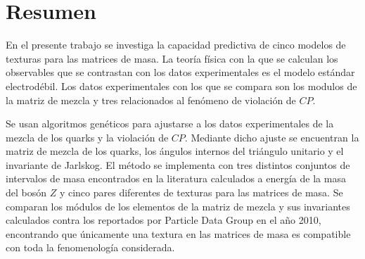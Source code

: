 \chapter*{Resumen}

En el presente trabajo se investiga la capacidad predictiva de cinco modelos de
texturas para las matrices de masa. La teor\'ia f\'isica con la que se calculan
los observables que se contrastan con los datos experimentales es el modelo
est\'andar electrod\'ebil. Los datos experimentales con los que se compara son
los modulos de la matriz de mezcla y  tres relacionados al fen\'omeno de
violaci\'on de $CP$.

Se usan algoritmos gen\'eticos para ajustarse a los datos experimentales de la 
mezcla de los quarks y la violaci\'on de $CP$. Mediante dicho ajuste se 
encuentran la matriz de mezcla de los quarks, los \'angulos internos del 
tri\'angulo unitario y el invariante de Jarlskog. El m\'etodo se implementa con
tres distintos conjuntos de intervalos de masa encontrados en la literatura 
calculados a energ\'ia de la masa del bos\'on $Z$ y cinco pares diferentes de
texturas para las matrices de masa. Se comparan los m\'odulos 
de los elementos de la matriz de mezcla y sus invariantes calculados contra
los reportados por Particle Data Group en el a\~no 2010, encontrando que 
\'unicamente una textura en las matrices de masa es compatible con toda la 
fenomenolog\'ia considerada. 
